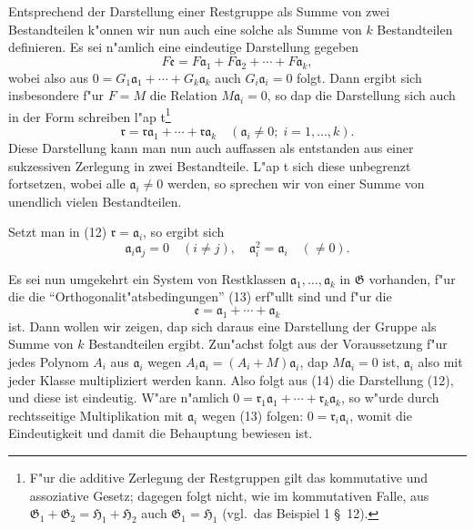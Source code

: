 \documentclass[12pt,a4paper]{article}
\begin{document}
Entsprechend der Darstellung einer Restgruppe als Summe von zwei Bestandteilen k"onnen wir nun auch eine solche als Summe von $k$ Bestandteilen definieren. Es sei n"amlich eine eindeutige Darstellung gegeben
\[
F\mathfrak{e} = F\mathfrak{a}_1 + F\mathfrak{a}_2 + \cdots + F\mathfrak{a}_k,
\]
wobei also aus $0 = G_1\mathfrak{a}_1 + \cdots + G_k\mathfrak{a}_k$ auch $G_i\mathfrak{a}_i = 0$ folgt. Dann ergibt sich insbesondere f"ur $F=M$ die Relation $M\mathfrak{a}_i = 0$, so dap die Darstellung sich auch in der Form schreiben l"ap t\footnote{F"ur die additive Zerlegung der Restgruppen gilt das kommutative und assoziative Gesetz; dagegen folgt nicht, wie im kommutativen Falle, aus $\mathfrak{G}_1 + \mathfrak{G}_2 = \mathfrak{H}_1 + \mathfrak{H}_2$ auch $\mathfrak{G}_1 = \mathfrak{H}_1$ (vgl.\ das Beispiel 1 \S\ 12).}
\begin{equation}
\mathfrak{r} = \mathfrak{r}\mathfrak{a}_1 + \cdots + \mathfrak{r}\mathfrak{a}_k \quad (\mathfrak{a}_i \neq 0; \; i=1,\ldots,k). \tag{12}
\end{equation}
Diese Darstellung kann man nun auch auffassen als entstanden aus einer sukzessiven Zerlegung in zwei Bestandteile. L"ap t sich diese unbegrenzt fortsetzen, wobei alle $\mathfrak{a}_i \neq 0$ werden, so sprechen wir von einer Summe von unendlich vielen Bestandteilen.

Setzt man in (12) $\mathfrak{r} = \mathfrak{a}_i$, so ergibt sich
\begin{equation}
\mathfrak{a}_i \mathfrak{a}_j = 0 \quad (i \neq j), \quad \mathfrak{a}_i^2 = \mathfrak{a}_i \quad (\neq 0). \tag{13}
\end{equation}

Es sei nun umgekehrt ein System von Restklassen $\mathfrak{a}_1,\ldots,\mathfrak{a}_k$ in $\mathfrak{G}$ vorhanden, f"ur die die ``Orthogonalit"atsbedingungen'' (13) erf"ullt sind und f"ur die
\begin{equation}
\mathfrak{e} = \mathfrak{a}_1 + \cdots + \mathfrak{a}_k \tag{14}
\end{equation}
ist. Dann wollen wir zeigen, dap sich daraus eine Darstellung der Gruppe als Summe von $k$ Bestandteilen ergibt. Zun"achst folgt aus der Voraussetzung f"ur jedes Polynom $A_i$ aus $\mathfrak{a}_i$ wegen $A_i\mathfrak{a}_i = (A_i + M)\mathfrak{a}_i$, dap $M\mathfrak{a}_i = 0$ ist, $\mathfrak{a}_i$ also mit jeder Klasse multipliziert werden kann. Also folgt aus (14) die Darstellung (12), und diese ist eindeutig. W"are n"amlich $0 = \mathfrak{r}_1\mathfrak{a}_1 + \cdots + \mathfrak{r}_k\mathfrak{a}_k$, so w"urde durch rechtsseitige Multiplikation mit $\mathfrak{a}_i$ wegen (13) folgen: $0 = \mathfrak{r}_i\mathfrak{a}_i$, womit die Eindeutigkeit und damit die Behauptung bewiesen ist.
\end{document}
